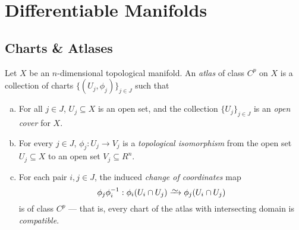 



\section{Differentiable Manifolds}

\subsection{Charts \& Atlases}

\begin{definition}[Atlas]
\label{def:Cp-atlas}
Let \(X\) be an \(n\)-dimensional topological manifold. An \emph{atlas} of class
\(C^p\) on \(X\) is a collection of charts \(\{(U_j, \phi_j)\}_{j \in J}\) such
that
\begin{enumerate}[(a)]\setlength\itemsep{0em}
\item For all \(j \in J\), \(U_j \subseteq X\) is an open set, and
  the collection \(\{U_j\}_{j \in J}\) is an \emph{open cover} for \(X\).

\item For every \(j \in J\), \(\phi_j: U_j \to V_j\) is a \emph{topological
  isomorphism} from the open set \(U_j \subseteq X\) to an open set \(V_j
  \subseteq R^n\).

\item For each pair \(i, j \in J\), the induced \emph{change of coordinates} map
  \[
  \phi_j \phi_i^{-1}: \phi_i(U_i \cap U_j) \isoto \phi_j(U_i \cap U_j)
  \]
  is of class \(C^p\) --- that is, every chart of the atlas with intersecting
  domain is \emph{compatible}.
\end{enumerate}
\end{definition}

